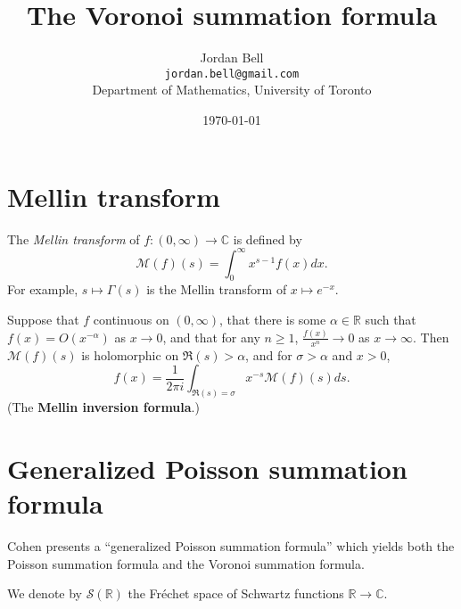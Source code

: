 \documentclass{article}
\begin{document}
\title{The Voronoi summation formula}
\author{Jordan Bell\\ \texttt{jordan.bell@gmail.com}\\Department of Mathematics, University of Toronto}
\date{\today}

\maketitle




\section{Mellin transform}
The {\em Mellin transform} of $f:(0,\infty) \to \mathbb{C}$ is defined by
\[
\mathscr{M}(f)(s) = \int_0^\infty x^{s-1} f(x) dx.
\]
For example, $s \mapsto \Gamma(s)$ is the Mellin transform of $x \mapsto e^{-x}$.


Suppose that $f$ continuous on $(0,\infty)$, that  there is some $\alpha \in \mathbb{R}$ such that
$f(x)=O(x^{-\alpha})$ as $x \to 0$, and that for any $n \geq 1$, $\frac{f(x)}{x^n} \to 0$ as $x \to \infty$. 
Then \cite[p.~107, Proposition 9.7.7]{cohen}
$\mathscr{M}(f)(s)$ is holomorphic on $\Re(s)>\alpha$, and
for $\sigma>\alpha$ and $x>0$,
\[
f(x)=\frac{1}{2\pi i}\int_{\Re(s)=\sigma} x^{-s} \mathscr{M}(f)(s) ds.
\] 
(The \textbf{Mellin inversion formula}.)



\section{Generalized Poisson summation formula}
Cohen \cite[pp.~177--182, \S 10.2.5]{cohen} presents a ``generalized Poisson summation formula'' which yields both the Poisson summation formula and the Voronoi
summation formula.

We denote by $\mathscr{S}(\mathbb{R})$ the Fr\'echet space of Schwartz functions $\mathbb{R} \to \mathbb{C}$.
\end{document}
